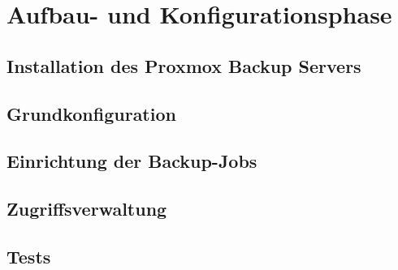 \section{Aufbau- und Konfigurationsphase}
\label{sec:Implementierungsphase}

\subsection{Installation des Proxmox Backup Servers}
\label{sec:Installation}


\subsection{Grundkonfiguration}
\label{sec:Grundkonfiguration}


\subsection{Einrichtung der Backup-Jobs}
\label{sec:BackupJobs}


\subsection{Zugriffsverwaltung}
\label{sec:Zugriffsverwaltung}


\subsection{Tests}
\label{sec:Tests}

